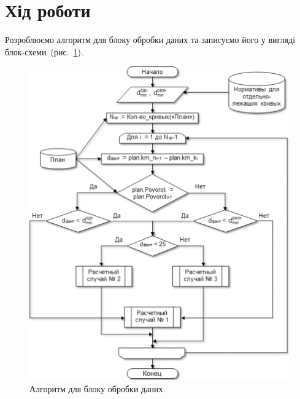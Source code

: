 \documentclass[a4paper,oneside,DIV=12,12pt,headings=normal]{scrartcl}
\begin{document}
	\section{Хід роботи}
		Розроблюємо алгоритм для блоку обробки даних та записуємо його у вигляді блок-схеми~(рис.~\ref{fig:algorithm}).
		\begin{figure}[!htbp]
		\centering
			\includegraphics[height = 30\baselineskip]{./assets/00.png}
		\caption{Алгоритм для блоку обробки даних}
		\label{fig:algorithm}
		\end{figure}
		
\end{document}

